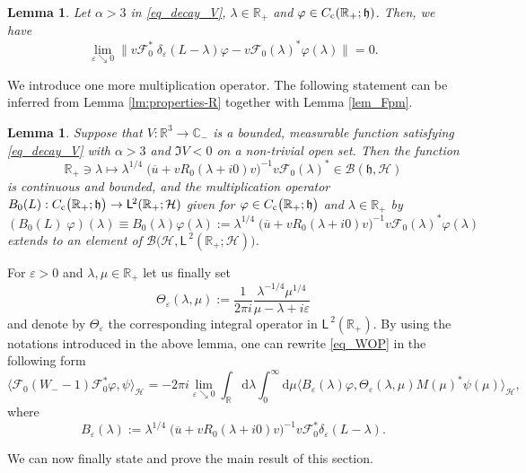 \documentclass{article}
\def\B{\mathscr B}
\def\C{\mathbb C}
\def\d{\mathrm{d}}
\def\F{\mathscr F}
\def\H{\mathcal H}
\def\R{\mathbb R}
\def\Hrond{\mathscr H}
\def\HS{\mathfrak h}
\def\ltwo{\mathsf{L}^{\:\!\!2}}
\newtheorem{Lemma}[Theorem]{Lemma}
\begin{document}
\begin{Lemma}\label{lem_limite}
Let $\alpha >3$ in \eqref{eq_decay_V}, $\lambda\in\R_+$ and $\varphi\in C_{\rm c}(\R_+;\HS)$. Then,
we have
$$
\lim_{\varepsilon\searrow 0}\big\|v\F_0^*\;\!\delta_\varepsilon(L-\lambda)\varphi
-v\F_0(\lambda)^*\varphi(\lambda)\big\|=0.
$$
\end{Lemma}

We introduce one more multiplication operator. The following statement can be inferred from Lemma \ref{lm:properties-R} together with Lemma \ref{lem_Fpm}. 

\begin{Lemma}\label{lem_on_sigma}
 Suppose that $V:\R^3\to \C_-$ is a bounded, measurable function satisfying \eqref{eq_decay_V} with $\alpha>3$ and $\Im V<0$ on a non-trivial open set.
Then the function
$$
\R_+\ni\lambda\mapsto
\lambda^{1/4}\;\!\big(\overline{u} +v R_0(\lambda+i0)v\big)^{-1}v\F_0(\lambda)^*\in\B(\HS,\H)
$$
is continuous and bounded, and the multiplication operator
$B_0(L): C_{\rm c}\big(\R_+;\HS\big)\to\ltwo(\R_+;\H)$ given
for $\varphi\in C_{\rm c}\big(\R_+;\HS\big)$ and $\lambda\in\R_+$ by 
\begin{equation}\label{defdeB}
(B_0(L) \;\!\varphi)(\lambda) 
\equiv B_0(\lambda) \varphi(\lambda) :=\lambda^{1/4}\;\!\big(\overline{u} +v R_0(\lambda+i0)v\big)^{-1}v\F_0(\lambda)^*\varphi(\lambda) 
\end{equation}
extends to an element of $\B\big(\Hrond,\ltwo(\R_+;\H)\big)$.
\end{Lemma}

For $\varepsilon>0$ and $\lambda, \mu \in \R_+$ let us finally set
$$
\Theta_\varepsilon(\lambda,\mu):=\frac{1}{2\pi i} \frac{\lambda^{-1/4}\mu^{1/4}}{\mu-\lambda+i\varepsilon}
$$
and denote by $\Theta_\varepsilon$ the corresponding integral operator in $\ltwo(\R_+)$.
By using the notations introduced in the above lemma, one can rewrite \eqref{eq_WOP} in the following form
\begin{equation}\label{eq_W_initial}
\langle \F_0 (W_--1)\F_0^*\varphi, \psi\rangle_\Hrond 
=  -2\pi i \lim_{\varepsilon\searrow 0} \int_{\R}\d \lambda \int_0^\infty \d \mu 
\big\langle  B_\varepsilon(\lambda) \varphi, 
 \Theta_\varepsilon(\lambda,\mu)M(\mu)^* \psi(\mu)\big\rangle_\H,
\end{equation}
where
$$
B_\varepsilon(\lambda):=\lambda^{1/4}\;\!\big(\overline{u} +v R_0(\lambda+i0)v\big)^{-1}v\F_0^*
\delta_\varepsilon(L-\lambda).
$$

We can now finally state and prove the main result of this section.
\end{document}
